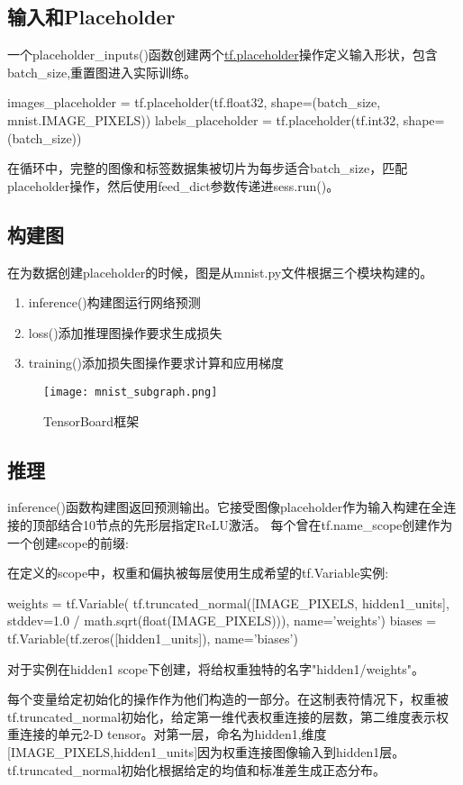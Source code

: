 \subsection{输入和Placeholder}
一个placeholder\_inputs()函数创建两个\href{https://www.tensorflow.org/api_docs/python/tf/placeholder}{tf.placeholder}操作定义输入形状，包含batch\_size,重置图进入实际训练。
\begin{pythoncode}
images_placeholder = tf.placeholder(tf.float32, shape=(batch_size,
                                                       mnist.IMAGE_PIXELS))
labels_placeholder = tf.placeholder(tf.int32, shape=(batch_size))
\end{pythoncode}
在循环中，完整的图像和标签数据集被切片为每步适合batch\_size，匹配placeholder操作，然后使用feed\_dict参数传递进sess.run()。
\subsection{构建图}
在为数据创建placeholder的时候，图是从mnist.py文件根据三个模块构建的。
\begin{enumerate}
\item inference()构建图运行网络预测
\item loss()添加推理图操作要求生成损失
\item training()添加损失图操作要求计算和应用梯度
\end{enumerate}
\begin{figure}[H]
\centering
\texttt{[image: mnist\_subgraph.png]}
\caption{TensorBoard框架}
\end{figure}
\subsection{推理}
inference()函数构建图返回预测输出。它接受图像placeholder作为输入构建在全连接的顶部结合10节点的先形层指定ReLU激活。
每个曾在tf.name\_scope创建作为一个创建scope的前缀:

在定义的scope中，权重和偏执被每层使用生成希望的tf.Variable实例:
\begin{pythoncode}
weights = tf.Variable(
    tf.truncated_normal([IMAGE_PIXELS, hidden1_units],
                        stddev=1.0 / math.sqrt(float(IMAGE_PIXELS))),
    name='weights')
biases = tf.Variable(tf.zeros([hidden1_units]),
                     name='biases')
\end{pythoncode}
对于实例在hidden1 scope下创建，将给权重独特的名字"hidden1/weights"。

每个变量给定初始化的操作作为他们构造的一部分。在这制表符情况下，权重被tf.truncated\_normal初始化，给定第一维代表权重连接的层数，第二维度表示权重连接的单元2-D tensor。对第一层，命名为hidden1,维度[IMAGE\_PIXELS,hidden1\_units]因为权重连接图像输入到hidden1层。tf.truncated\_normal初始化根据给定的均值和标准差生成正态分布。


